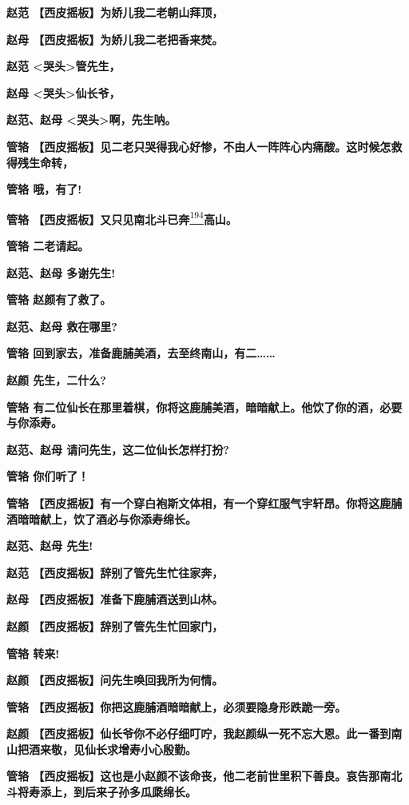 \textbf{赵范 【西皮摇板】为娇儿我二老朝山拜顶，}

\textbf{赵母 【西皮摇板】为娇儿我二老把香来焚。}

\textbf{赵范 \textless{}哭头\textgreater{}管先生，}

\textbf{赵母 \textless{}哭头\textgreater{}仙长爷，}

\textbf{赵范、赵母 \textless{}哭头\textgreater{}啊，先生呐。}

\textbf{管辂
【西皮摇板】见二老只哭得我心好惨，不由人一阵阵心内痛酸。这时候怎救得残生命转，}

\textbf{管辂 哦，有了!}

\textbf{管辂
【西皮摇板】又只见南北斗已奔}\protect\hyperlink{fn194}{\textsuperscript{194}}\textbf{高山。}

\textbf{管辂 二老请起。}

\textbf{赵范、赵母 多谢先生!}

\textbf{管辂 赵颜有了救了。}

\textbf{赵范、赵母 救在哪里?}

\textbf{管辂 回到家去，准备鹿脯美酒，去至终南山，有二\ldots{}\ldots{}}

\textbf{赵颜 先生，二什么?}

\textbf{管辂
有二位仙长在那里着棋，你将这鹿脯美酒，暗暗献上。他饮了你的酒，必要与你添寿。}

\textbf{赵范、赵母 请问先生，这二位仙长怎样打扮?}

\textbf{管辂 你们听了！}

\textbf{管辂
【西皮摇板】有一个穿白袍斯文体相，有一个穿红服气宇轩昂。你将这鹿脯酒暗暗献上，饮了酒必与你添寿绵长。}

\textbf{赵范、赵母 先生!}

\textbf{赵范 【西皮摇板】辞别了管先生忙往家奔，}

\textbf{赵母 【西皮摇板】准备下鹿脯酒送到山林。}

\textbf{赵颜 【西皮摇板】辞别了管先生忙回家门，}

\textbf{管辂 转来!}

\textbf{赵颜 【西皮摇板】问先生唤回我所为何情。}

\textbf{管辂 【西皮摇板】你把这鹿脯酒暗暗献上，必须要隐身形跌跪一旁。}

\textbf{赵颜
【西皮摇板】仙长爷你不必仔细叮咛，我赵颜纵一死不忘大恩。此一番到南山把酒来敬，见仙长求增寿小心殷勤。}

\textbf{管辂
【西皮摇板】这也是小赵颜不该命丧，他二老前世里积下善良。哀告那南北斗将寿添上，到后来子孙多瓜瓞绵长。}

